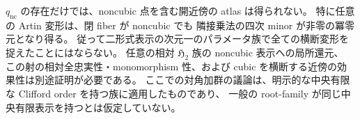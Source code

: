 \begin{remark}
$q_{\mathrm{nc}}$ の存在だけでは、noncubic 点を含む開近傍の atlas は得られない。
特に任意の Artin 変形は、閉 fiber が noncubic でも
隣接乗法の四次 minor が非零の冪零元となり得る。
従って二形式表示の次元一のパラメータ族で全ての横断変形を捉えたことにはならない。
任意の相対 $\mathfrak H_2$ 族の noncubic 表示への局所還元、
この射の相対全忠実性・monomorphism 性、および cubic を横断する近傍の効果性は別途証明が必要である。
ここでの対角加群の議論は、明示的な中央有限な Clifford order を持つ族に適用したものであり、
一般の root-family が同じ中央有限表示を持つとは仮定していない。
\end{remark}

